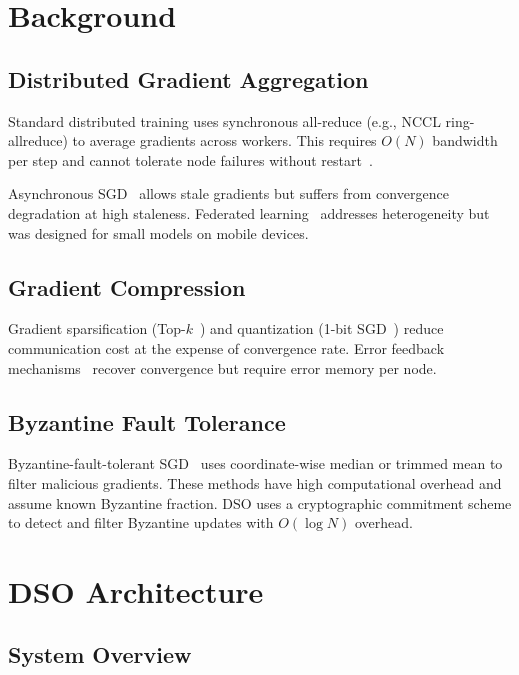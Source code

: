\documentclass[11pt,a4paper]{article}
\begin{document}
\section{Background}

\subsection{Distributed Gradient Aggregation}

Standard distributed training uses synchronous all-reduce (e.g., NCCL ring-allreduce)
to average gradients across workers. This requires $O(N)$ bandwidth per step and
cannot tolerate node failures without restart~\cite{rajbhandari2020zero}.

Asynchronous SGD~\cite{dean2012distbelief} allows stale gradients but suffers from
convergence degradation at high staleness. Federated learning~\cite{mcmahan2017fedavg}
addresses heterogeneity but was designed for small models on mobile devices.

\subsection{Gradient Compression}

Gradient sparsification (Top-$k$~\cite{stich2018sparsified}) and quantization
(1-bit SGD~\cite{seide20141bit}) reduce communication cost at the expense of convergence
rate. Error feedback mechanisms~\cite{karimireddy2019error} recover convergence but
require error memory per node.

\subsection{Byzantine Fault Tolerance}

Byzantine-fault-tolerant SGD~\cite{blanchard2017machine} uses coordinate-wise median
or trimmed mean to filter malicious gradients. These methods have high computational
overhead and assume known Byzantine fraction. DSO uses a cryptographic commitment
scheme to detect and filter Byzantine updates with $O(\log N)$ overhead.

\section{DSO Architecture}

\subsection{System Overview}
\end{document}
